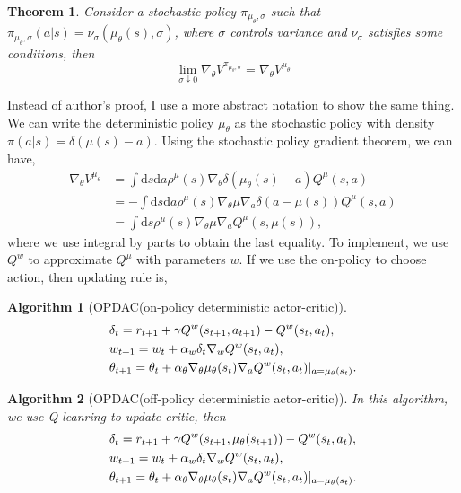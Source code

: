 \documentclass[11pt,a4paper]{article}
\def\d{{\mathrm d}}
\newtheorem{theorem}{Theorem}[subsection]
\newtheorem{algorithm}{Algorithm}[subsection]
\begin{document}
\begin{theorem}
Consider a stochastic policy $\pi_{\mu_{\theta},\sigma}$ such that $\pi_{\mu_{\theta},\sigma}(a|s) = \nu_{\sigma}(\mu_{\theta}(s),\sigma)$, where $\sigma$ controls variance and $\nu_{\sigma}$ satisfies some conditions, then
\begin{equation}
\lim_{\sigma \downarrow 0} \nabla_\theta V^{\pi_{\mu_{\theta},\sigma}} = \nabla_{\theta}V^{\mu_{\theta}}
\end{equation}
\end{theorem}
Instead of author's proof, I use a more abstract notation to show the same thing. We can write the deterministic policy $\mu_{\theta}$ as the stochastic policy with density $\pi(a|s) =\delta(\mu(s)-a)$. Using the stochastic policy gradient theorem, we can have,
\begin{align}
\nabla_{\theta}V^{\mu_{\theta}} & = \int \d s \d a \rho^{\mu}(s) \nabla_{\theta}\delta(\mu_{\theta}(s)-a)Q^{\mu}(s,a)\\ 
& = -\int \d s \d a \rho^{\mu}(s) \nabla_{\theta}\mu \nabla_a \delta(a-\mu(s))Q^{\mu}(s,a) \\ 
& = \int \d s \rho^{\mu}(s) \nabla_{\theta}\mu \nabla_a Q^{\mu}(s,\mu(s)),
\end{align}
where we use integral by parts to obtain the last equality. To implement, we use $Q^{w}$ to approximate $Q^{\mu}$ with parameters $w$. If we use the on-policy to choose action, then updating rule is,
\begin{algorithm}[OPDAC(on-policy deterministic actor-critic)]
\begin{equation}
\aligned 
& \delta_t = r_{t+1} + \gamma Q^{w}(s_{t+1},a_{t+1}) - Q^w(s_t,a_t), \\ 
& w_{t+1} = w_t + \alpha_w \delta_t \nabla_w Q^w(s_t,a_t), \\ 
& \theta_{t+1} = \theta_t + \alpha_\theta \nabla_{\theta}\mu_{\theta}(s_t)\nabla_aQ^{w}(s_t,a_t)|_{a=\mu_{\theta}(s_t)}.
\endaligned
\end{equation}
\end{algorithm}
\begin{algorithm}[OPDAC(off-policy deterministic actor-critic)]
In this algorithm, we use Q-leanring to update critic, then 
\begin{equation}
\aligned 
& \delta_t = r_{t+1} + \gamma Q^{w}(s_{t+1},\mu_{\theta}(s_{t+1})) - Q^w(s_t,a_t), \\ 
& w_{t+1} = w_t + \alpha_w \delta_t \nabla_w Q^w(s_t,a_t), \\ 
& \theta_{t+1} = \theta_t + \alpha_\theta \nabla_{\theta}\mu_{\theta}(s_t)\nabla_aQ^{w}(s_t,a_t)|_{a=\mu_{\theta}(s_t)}.
\endaligned
\end{equation}
\end{algorithm}
\end{document}
